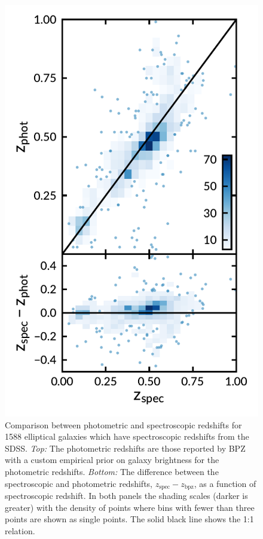 \documentclass[apj, revtex4-1]{emulateapj}
\begin{document}
\begin{figure}
	\includegraphics[width=\columnwidth]{figures/specVSphot.pdf}
	\caption{Comparison between photometric and spectroscopic redshifts for 1588 elliptical galaxies which have spectroscopic redshifts from the SDSS. \textit{Top:} The photometric redshifts are those reported by BPZ with a custom empirical prior on galaxy brightness for the photometric redshifts. \textit{Bottom:} The difference between the spectroscopic and photometric redshifts, $z_\mathrm{spec} - z_\mathrm{bpz}$, as a function of spectroscopic redshift. In both panels the shading scales (darker is greater) with the density of points where bins with fewer than three points are shown as single points. The solid black line shows the 1:1 relation.}
	\label{fig:photozspecz}
\end{figure}
\end{document}
